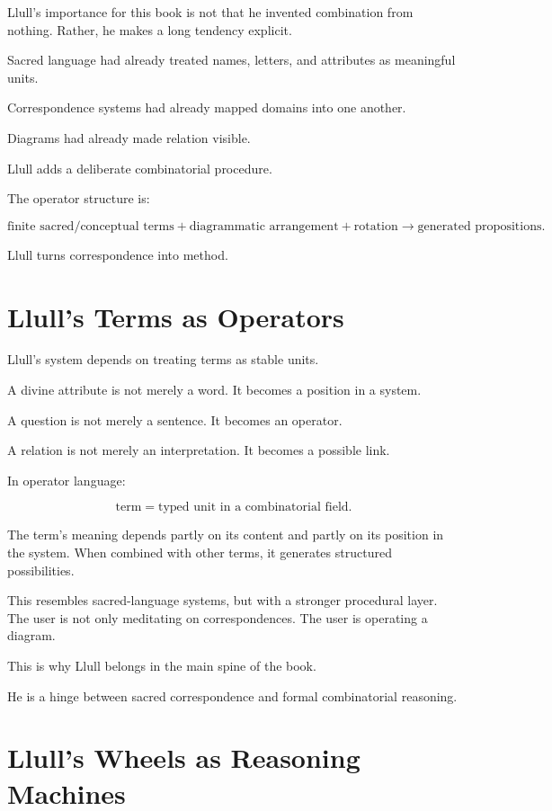 \documentclass[11pt]{book}
\begin{document}
Llull's importance for this book is not that he invented combination from nothing. Rather, he makes a long tendency explicit.

Sacred language had already treated names, letters, and attributes as meaningful units.

Correspondence systems had already mapped domains into one another.

Diagrams had already made relation visible.

Llull adds a deliberate combinatorial procedure.

The operator structure is:

\[
\text{finite sacred/conceptual terms}
+
\text{diagrammatic arrangement}
+
\text{rotation}
\rightarrow
\text{generated propositions}.
\]

Llull turns correspondence into method.

\section{Llull's Terms as Operators}

Llull's system depends on treating terms as stable units.

A divine attribute is not merely a word. It becomes a position in a system.

A question is not merely a sentence. It becomes an operator.

A relation is not merely an interpretation. It becomes a possible link.

In operator language:

\[
\text{term} = \text{typed unit in a combinatorial field}.
\]

The term's meaning depends partly on its content and partly on its position in the system. When combined with other terms, it generates structured possibilities.

This resembles sacred-language systems, but with a stronger procedural layer. The user is not only meditating on correspondences. The user is operating a diagram.

This is why Llull belongs in the main spine of the book.

He is a hinge between sacred correspondence and formal combinatorial reasoning.

\section{Llull's Wheels as Reasoning Machines}
\end{document}
